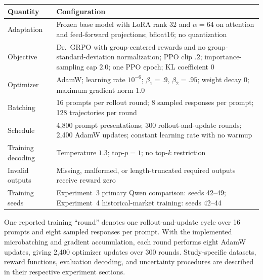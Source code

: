 \begin{center}
\begin{minipage}{\linewidth}
\centering
{}
\label{tab:exp3-oat-common}
\small
\begin{tabular}{p{.28\linewidth}p{.66\linewidth}}
\toprule
Quantity & Configuration \\
\midrule
Adaptation & Frozen base model with LoRA rank 32 and $\alpha=64$ on attention and feed-forward projections; bfloat16; no quantization \\
Objective & Dr.~GRPO with group-centered rewards and no group-standard-deviation normalization; PPO clip $.2$; importance-sampling cap $2.0$; one PPO epoch; KL coefficient $0$ \\
Optimizer & AdamW; learning rate $10^{-6}$; $\beta_1=.9$, $\beta_2=.95$; weight decay $0$; maximum gradient norm $1.0$ \\
Batching & 16 prompts per rollout round; 8 sampled responses per prompt; 128 trajectories per round \\
Schedule & 4,800 prompt presentations; 300 rollout-and-update rounds; 2,400 AdamW updates; constant learning rate with no warmup \\
Training decoding & Temperature $1.3$; top-$p=1$; no top-$k$ restriction \\
Invalid outputs & Missing, malformed, or length-truncated required outputs receive reward zero \\
Training seeds & Experiment~3 primary Qwen comparison: seeds 42--49; Experiment~4 historical-market training: seeds 42--44 \\
\bottomrule
\end{tabular}
\end{minipage}
\end{center}

One reported training ``round'' denotes one rollout-and-update cycle over 16 prompts and eight sampled responses per prompt.
With the implemented microbatching and gradient accumulation, each round performs eight AdamW updates, giving 2,400 optimizer updates over 300 rounds.
Study-specific datasets, reward functions, evaluation decoding, and uncertainty procedures are described in their respective experiment sections.
